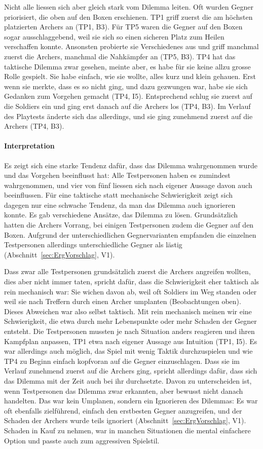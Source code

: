 \documentclass[../Main.tex]{subfiles}
\begin{document}
Nicht alle liessen sich aber gleich stark vom Dilemma leiten. Oft wurden Gegner priorisiert, die oben auf den Boxen erschienen. TP1 griff zuerst die am höchsten platzierten Archers an (TP1, B3). Für TP5 waren die Gegner auf den Boxen sogar ausschlaggebend, weil sie sich so einen sicheren Platz zum Heilen verschaffen konnte. Ansonsten probierte sie Verschiedenes aus und griff manchmal zuerst die Archers, manchmal die Nahkämpfer an (TP5, B3). TP4 hat das taktische Dilemma zwar gesehen, meinte aber, es habe für sie keine allzu grosse Rolle gespielt. Sie habe einfach, wie sie wollte, alles kurz und klein gehauen. Erst wenn sie merkte, dass es so nicht ging, und dazu gezwungen war, habe sie sich Gedanken zum Vorgehen gemacht (TP4, I5). Entsprechend schlug sie zuerst auf die Soldiers ein und ging erst danach auf die Archers los (TP4, B3). Im Verlauf des Playtests änderte sich das allerdings, und sie ging zunehmend zuerst auf die Archers (TP4, B3).

\paragraph{Interpretation}
Es zeigt sich eine starke Tendenz dafür, dass das Dilemma wahrgenommen wurde und das Vorgehen beeinflusst hat: Alle Testpersonen haben es zumindest wahrgenommen, und vier von fünf liessen sich nach eigener Aussage davon auch beeinflussen. Für eine taktische statt mechanische Schwierigkeit zeigt sich dagegen nur eine schwache Tendenz, da man das Dilemma auch ignorieren konnte. Es gab verschiedene Ansätze, das Dilemma zu lösen. Grundsätzlich hatten die Archers Vorrang, bei einigen Testpersonen zudem die Gegner auf den Boxen. Aufgrund der unterschiedlichen Gegnervarianten empfanden die einzelnen Testpersonen allerdings unterschiedliche Gegner als lästig (Abschnitt~\ref{sec:ErgVorschlag}, V1).

Dass zwar alle Testpersonen grundsätzlich zuerst die Archers angreifen wollten, dies aber nicht immer taten, spricht dafür, dass die Schwierigkeit eher taktisch als rein mechanisch war: Sie wichen davon ab, weil oft Soldiers im Weg standen oder weil sie nach Treffern durch einen Archer umplanten (Beobachtungen oben). Dieses Abweichen war also selbst taktisch. Mit rein mechanisch meinen wir eine Schwierigkeit, die etwa durch mehr Lebenspunkte oder mehr Schaden der Gegner entsteht. Die Testpersonen mussten je nach Situation anders reagieren und ihren Kampfplan anpassen, TP1 etwa nach eigener Aussage aus Intuition (TP1, I5). Es war allerdings auch möglich, das Spiel mit wenig Taktik durchzuspielen und wie TP4 zu Beginn einfach kopfvoran auf die Gegner einzuschlagen. Dass sie im Verlauf zunehmend zuerst auf die Archers ging, spricht allerdings dafür, dass sich das Dilemma mit der Zeit auch bei ihr durchsetzte. Davon zu unterscheiden ist, wenn Testpersonen das Dilemma zwar erkannten, aber bewusst nicht danach handelten. Das war kein Umplanen, sondern ein Ignorieren des Dilemmas: Es war oft ebenfalls zielführend, einfach den erstbesten Gegner anzugreifen, und der Schaden der Archers wurde teils ignoriert (Abschnitt~\ref{sec:ErgVorschlag}, V1). Schaden in Kauf zu nehmen, war in manchen Situationen die mental einfachere Option und passte auch zum aggressiven Spielstil.
\end{document}

